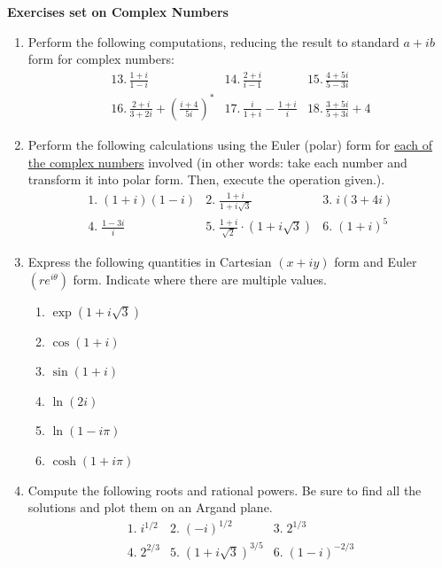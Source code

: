 \documentclass[fleqn]{article}
\begin{document}
\pagebreak

\textbf{Exercises set on Complex Numbers}

\begin{enumerate}

  \item  Perform  the following computations, reducing the result to
  standard $a+ib$ form for complex numbers: 
  \[
  \begin{array}{lll}
  13.\,\frac{\textstyle 1+i}{\textstyle 1-i} & 14.\,\frac{\textstyle 2+i}{\textstyle i-1} & 15.\,\frac{\textstyle 4+5i}{\textstyle 5-3i} \\ 
  16.\,\frac{\textstyle 2+i}{\textstyle 3+2i}+\left( \frac{\textstyle i+4}{\textstyle 5i}\right)^{\ast} & 17.\,\frac{\textstyle i}{\textstyle 1+i}-\frac{\textstyle 1+i}{\textstyle i} & 18.\,\frac{\textstyle 3+5i}{\textstyle 5+3i}+4
  \end{array}
  \]
  
  
  \item Perform the following calculations using the Euler (polar) form for \underline{each of the complex numbers} involved (in other words: take each number and transform it into polar form. Then, execute the operation given.).
  \[
  \begin{array}{lll}
  1.\;\left( 1+i\right) \left( 1-i\right)  & 2.\;\frac{\textstyle 1+i}{\textstyle 1+i\sqrt{3}} & 3.\;i\left( 3+4i\right)  \\ 
  4.\;\frac{\textstyle 1-3i}{\textstyle i} & 5.\;\frac{\textstyle 1+i}{\textstyle \sqrt{2}}\cdot \left( 1+i\sqrt{3}\right)  & 6.\;\left( 1+i\right) ^{5}
  \end{array}
  \]
  
  \item Express the following quantities in Cartesian $\left(x+iy\right) $ form and Euler $\left( re^{i\theta}\right)$ form. Indicate where there are multiple values.
  
  \begin{enumerate}
    \item $\exp \left( 1+i\sqrt{3}\right)$
    
    \item $\cos \left( 1+i\right)$
    
    \item $\sin \left( 1+i\right)$
    
    \item $\ln (2i)$
    
    \item $\ln \left( 1-i\pi \right)$
    
    \item $\cosh \left( 1+i\pi \right)$
  \end{enumerate}
  
  \item Compute the following roots and rational powers. Be sure to find all the solutions and plot them on an Argand plane. 
  \[
  \begin{array}{lll}
  1.\;i^{1/2} & 2.\;\left( -i\right) ^{1/2} & 3.\;2^{1/3} \\ 
  4.\;2^{2/3} & 5.\;(1+i\sqrt{3})^{3/5} & 6.\;\left( 1-i\right) ^{-2/3}
  \end{array}
  \]
  \end{enumerate}
\end{document}
